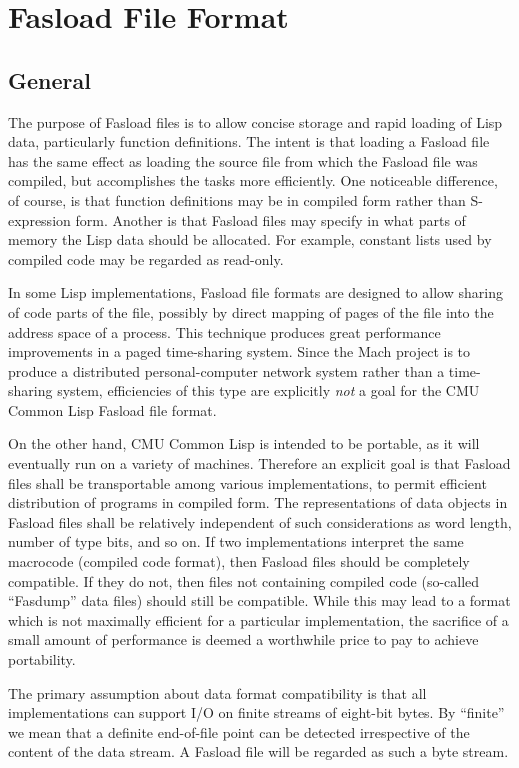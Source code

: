 \chapter{Fasload File Format}%
\section{General}

The purpose of Fasload files is to allow concise storage and rapid
loading of Lisp data, particularly function definitions.  The intent
is that loading a Fasload file has the same effect as loading the
source file from which the Fasload file was compiled, but accomplishes
the tasks more efficiently.  One noticeable difference, of course, is
that function definitions may be in compiled form rather than
S-expression form.  Another is that Fasload files may specify in what
parts of memory the Lisp data should be allocated.  For example,
constant lists used by compiled code may be regarded as read-only.

In some Lisp implementations, Fasload file formats are designed to
allow sharing of code parts of the file, possibly by direct mapping
of pages of the file into the address space of a process.  This
technique produces great performance improvements in a paged
time-sharing system.  Since the Mach project is to produce a
distributed personal-computer network system rather than a
time-sharing system, efficiencies of this type are explicitly {\it not}
a goal for the CMU Common Lisp Fasload file format.

On the other hand, CMU Common Lisp is intended to be portable, as it will
eventually run on a variety of machines.  Therefore an explicit goal
is that Fasload files shall be transportable among various
implementations, to permit efficient distribution of programs in
compiled form.  The representations of data objects in Fasload files
shall be relatively independent of such considerations as word
length, number of type bits, and so on.  If two implementations
interpret the same macrocode (compiled code format), then Fasload
files should be completely compatible.  If they do not, then files
not containing compiled code (so-called ``Fasdump'' data files) should
still be compatible.  While this may lead to a format which is not
maximally efficient for a particular implementation, the sacrifice of
a small amount of performance is deemed a worthwhile price to pay to
achieve portability.

The primary assumption about data format compatibility is that all
implementations can support I/O on finite streams of eight-bit bytes.
By ``finite'' we mean that a definite end-of-file point can be detected
irrespective of the content of the data stream.  A Fasload file will
be regarded as such a byte stream.

